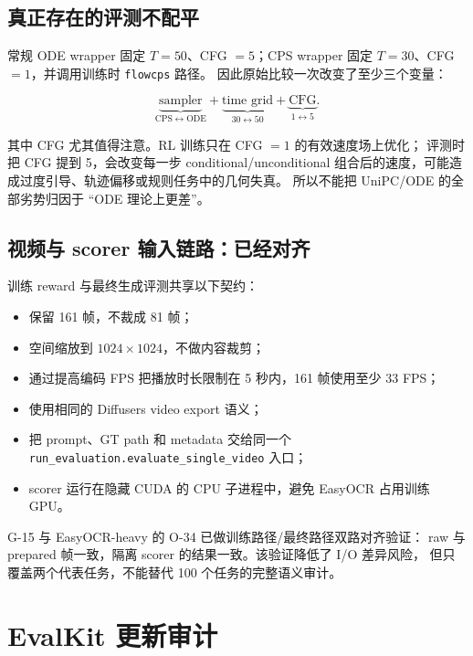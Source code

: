 \documentclass[11pt,a4paper]{article}
\newcommand{\code}[1]{\texttt{#1}}
\begin{document}
\subsection{真正存在的评测不配平}

常规 ODE wrapper 固定 $T=50$、CFG $=5$；CPS wrapper 固定
$T=30$、CFG $=1$，并调用训练时 \code{flowcps} 路径。
因此原始比较一次改变了至少三个变量：

\begin{equation}
  \underbrace{\text{sampler}}_{\mathrm{CPS}\leftrightarrow\mathrm{ODE}}
  +\underbrace{\text{time grid}}_{30\leftrightarrow50}
  +\underbrace{\text{CFG}}_{1\leftrightarrow5}.
\end{equation}

其中 CFG 尤其值得注意。RL 训练只在 CFG $=1$ 的有效速度场上优化；
评测时把 CFG 提到 5，会改变每一步 conditional/unconditional
组合后的速度，可能造成过度引导、轨迹偏移或规则任务中的几何失真。
所以不能把 UniPC/ODE 的全部劣势归因于 ``ODE 理论上更差''。

\subsection{视频与 scorer 输入链路：已经对齐}

训练 reward 与最终生成评测共享以下契约：

\begin{itemize}
  \item 保留 161 帧，不裁成 81 帧；
  \item 空间缩放到 $1024\times1024$，不做内容裁剪；
  \item 通过提高编码 FPS 把播放时长限制在 5 秒内，161 帧使用至少 33 FPS；
  \item 使用相同的 Diffusers video export 语义；
  \item 把 prompt、GT path 和 metadata 交给同一个
  \code{run\_evaluation.evaluate\_single\_video} 入口；
  \item scorer 运行在隐藏 CUDA 的 CPU 子进程中，避免 EasyOCR 占用训练 GPU。
\end{itemize}

G-15 与 EasyOCR-heavy 的 O-34 已做训练路径/最终路径双路对齐验证：
raw 与 prepared 帧一致，隔离 scorer 的结果一致。该验证降低了 I/O 差异风险，
但只覆盖两个代表任务，不能替代 100 个任务的完整语义审计。

\section{EvalKit 更新审计}
\end{document}
